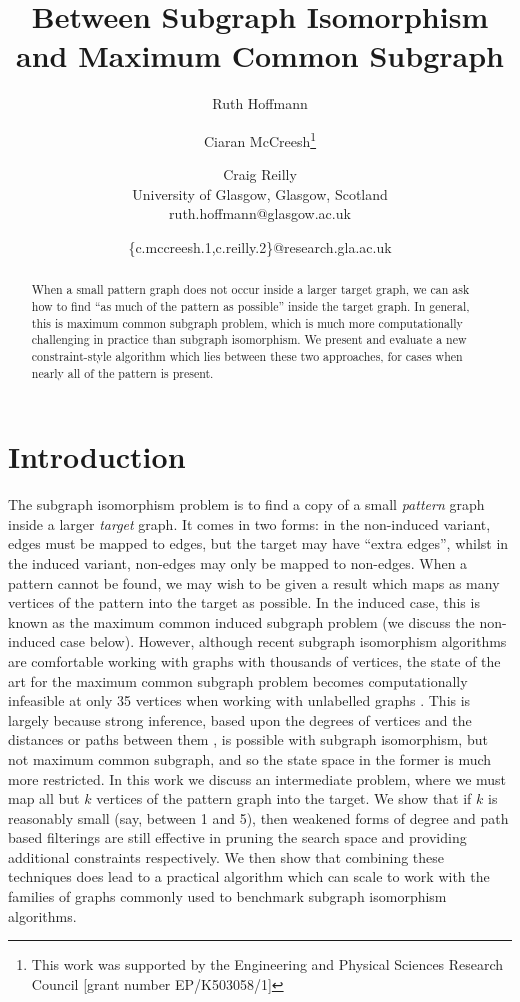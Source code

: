 \documentclass[letterpaper]{article}
\title{Between Subgraph Isomorphism and Maximum Common Subgraph}
\author{Ruth Hoffmann \and Ciaran McCreesh\thanks{This work was supported by the Engineering and Physical Sciences
Research Council [grant number EP/K503058/1]} \and Craig Reilly \\
University of Glasgow, Glasgow, Scotland \\
ruth.hoffmann@glasgow.ac.uk \and \{c.mccreesh.1,c.reilly.2\}@research.gla.ac.uk}
\begin{document}
\maketitle

\begin{abstract}
    When a small pattern graph does not occur inside a larger target graph, we can ask how to find
    ``as much of the pattern as possible'' inside the target graph. In general, this is maximum
    common subgraph problem, which is much more computationally challenging in practice than
    subgraph isomorphism. We present and evaluate a new constraint-style algorithm which lies
    between these two approaches, for cases when nearly all of the pattern is present.
\end{abstract}

\section{Introduction}

The subgraph isomorphism problem is to find a copy of a small \emph{pattern} graph inside a larger
\emph{target} graph. It comes in two forms: in the non-induced variant, edges must be mapped to
edges, but the target may have ``extra edges'', whilst in the induced variant, non-edges may only be
mapped to non-edges. When a pattern cannot be found, we may wish to be given a result which maps as
many vertices of the pattern into the target as possible. In the induced case, this is known as the
maximum common induced subgraph problem (we discuss the non-induced case below). However, although
recent subgraph isomorphism algorithms are comfortable working with graphs with thousands of
vertices, the state of the art for the maximum common subgraph problem becomes computationally
infeasible at only 35 vertices when working with unlabelled graphs \citep{CP2016MCSPaper}. This is
largely because strong inference, based upon the degrees of vertices
\citep{DBLP:journals/ai/Solnon10} and the distances or paths between them
\citep{DBLP:conf/cp/AudemardLMGP14,DBLP:conf/cp/McCreeshP15}, is possible with subgraph isomorphism,
but not maximum common subgraph, and so the state space in the former is much more restricted. In
this work we discuss an intermediate problem, where we must map all but $k$ vertices of the pattern
graph into the target. We show that if $k$ is reasonably small (say, between 1 and 5), then weakened
forms of degree and path based filterings are still effective in pruning the search space and
providing additional constraints respectively. We then show that combining these techniques does
lead to a practical algorithm which can scale to work with the families of graphs commonly used to
benchmark subgraph isomorphism algorithms.
\end{document}

